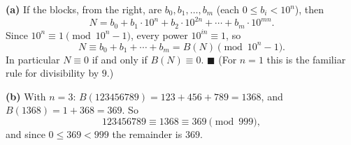 \textbf{(a)} If the blocks, from the right, are $b_0,b_1,\dots,b_m$ (each $0\le b_i<10^n$), then
\[N=b_0+b_1\cdot10^n+b_2\cdot10^{2n}+\cdots+b_m\cdot10^{mn}.\]
Since $10^n\equiv1\pmod{10^n-1}$, every power $10^{in}\equiv1$, so
\[N\equiv b_0+b_1+\cdots+b_m=B(N)\pmod{10^n-1}.\]
In particular $N\equiv0$ if and only if $B(N)\equiv0$. $\blacksquare$ (For $n=1$ this is the familiar rule for divisibility by $9$.)

\textbf{(b)} With $n=3$: $B(123456789)=123+456+789=1368$, and $B(1368)=1+368=369$. So
\[123456789\equiv1368\equiv369\pmod{999},\]
and since $0\le369<999$ the remainder is $\boxed{369}$.
